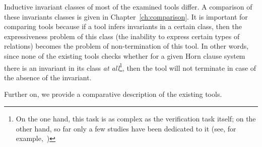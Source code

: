 Inductive invariant classes of most of the examined tools differ. A comparison of these invariants classes is given in Chapter~\cref{ch:comparison}. It is important for comparing tools because if a tool infers invariants in a certain class, then the expressiveness problem of this class (the inability to express certain types of relations) becomes the problem of non-termination of this tool. In other words, since none of the existing tools checks whether for a given Horn clause system there is an invariant in its class \emph{at all}\footnote{On the one hand, this task is as complex as the verification task itself; on the other hand, so far only a few studies have been dedicated to it (see, for example,~\cite{10.1145/3022187,10.1145/2837614.2837640})}, then the tool will not terminate in case of the absence of the invariant.

Further on, we provide a comparative description of the existing tools.

